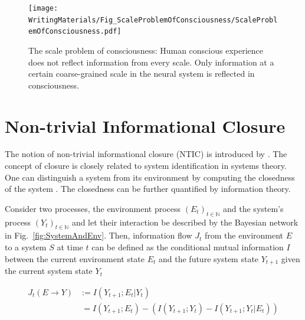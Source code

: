\documentclass[utf8]{article}
\begin{document}
		\begin{figure}[H]
		    \centering
			\texttt{[image: WritingMaterials/Fig\_ScaleProblemOfConsciousness/ScaleProblemOfConsciousness.pdf]}
			\caption{The scale problem of consciousness: Human conscious experience does not reflect information from every scale. Only information at a certain coarse-grained scale in the neural system is reflected in consciousness.}
			\label{fig:scaleproblem}
	   	\end{figure}


	\section{Non-trivial Informational Closure} \label{sec:Non-trivial informational closure}
		The notion of non-trivial informational closure (NTIC) is introduced by \cite{BERTSCHINGER.2006}. The concept of closure is closely related to system identification in systems theory. One can distinguish a system from its environment by computing the closedness of the system \citep{maturana1991autopoiesis, rosen1991life, pattee2012evolving, luhmann1995probleme}. The closedness can be further quantified by information theory.



			Consider two processes, the environment process $(E_t)_{t \in \mathbb{N}}$ and the system's process $(Y_t)_{t \in \mathbb{N}}$ and let their interaction be described by the Bayesian network in Fig.~\ref{fig:SystemAndEnv}. Then, information flow $J_{t}$ from the environment $E$ to a system $S$ at time $t$ can be defined as the conditional mutual information $I$ between the current environment state $E_{t}$  and the future system state $Y_{t+1}$ given the current system state $Y_{t}$

				\begin{equation}
    				\label{eq:InformationFlow}
    				\left.\begin{array}
    				{rl}{J_{t}(E \rightarrow Y )} & {:= I(Y_{t+1};E_{t}|Y_{t})} \\
    				{ } & { \ = I(Y_{t+1};E_{t}) - (I(Y_{t+1};Y_{t})-I(Y_{t+1};Y_{t}|E_{t}))}
    				\end{array}\right.
				\end{equation}
\end{document}
